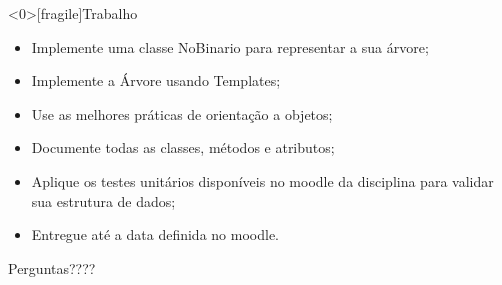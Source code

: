 \documentclass[12pt,table,xcolor={dvipsnames}]{beamer}
\begin{document}
\begin{frame}<0>[fragile]{Trabalho}
\begin{itemize}
\item Implemente uma classe NoBinario para representar a sua árvore;
\item Implemente a Árvore usando Templates;
\item Use as melhores práticas de orientação a objetos;
\item Documente todas as classes, métodos e atributos;
\item Aplique os testes unitários disponíveis no moodle da disciplina para validar sua estrutura de dados;
\item Entregue até a data definida no moodle.
\end{itemize}
\end{frame}

{
\begin{frame}

{\LARGE Perguntas????}

\end{frame}
}
\end{document}
